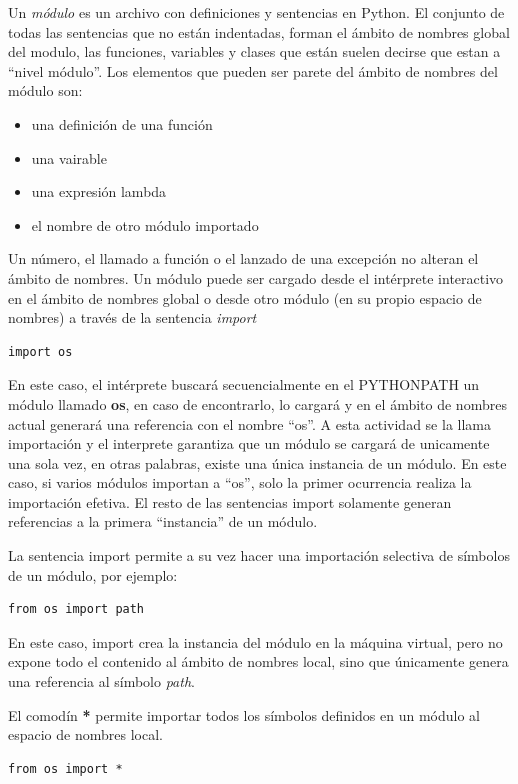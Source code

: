 \documentclass[a4paper]{report}
\begin{document}
Un \emph{módulo} es un archivo con definiciones y sentencias en Python.
El conjunto de todas las sentencias que no están indentadas, forman el ámbito de nombres global del modulo,
las funciones, variables y clases que están suelen decirse que estan a ``nivel módulo''. Los elementos que pueden
ser parete del ámbito de nombres del módulo son:
\begin{itemize}
  \item una definición de una función
  \item una vairable
  \item una expresión lambda
  \item el nombre de otro módulo importado
\end{itemize}


Un número, el llamado a función o el lanzado de una excepción no alteran el ámbito de nombres.
Un módulo puede ser cargado desde el intérprete interactivo en el ámbito de nombres global
o desde otro módulo (en su propio espacio de nombres) a través de 
la sentencia \emph{import}
\begin{lstlisting}[style=python]
import os
\end{lstlisting}
En este caso, el intérprete buscará secuencialmente en el PYTHONPATH un módulo llamado \textbf{os}, 
en caso de encontrarlo, lo cargará y en el ámbito de nombres actual generará una referencia con el 
nombre ``os''. A esta actividad se la llama importación y el interprete garantiza que un módulo
se cargará de unicamente una sola vez, en otras palabras, existe una única instancia de un módulo.
En este caso, si varios módulos importan a ``os'', solo la primer ocurrencia realiza la importación efetiva.
El resto de las sentencias import solamente generan referencias a la primera ``instancia'' de un módulo.

La sentencia import permite a su vez hacer una importación selectiva de símbolos de un módulo, 
por ejemplo:
\begin{lstlisting}[style=python]
from os import path
\end{lstlisting}
En este caso, import crea la instancia del módulo en la máquina virtual, pero no expone todo el contenido
al ámbito de nombres local, sino que únicamente genera una referencia al símbolo \emph{path}.

El comodín \textbf{*} permite importar todos los símbolos definidos en un módulo al espacio de nombres local.
\begin{lstlisting}[style=python]
from os import *
\end{lstlisting}
\end{document}

